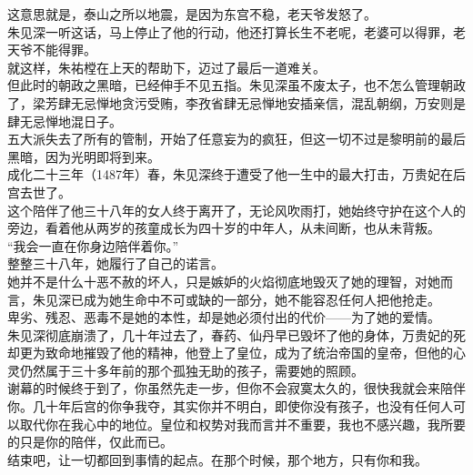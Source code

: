 \begin{multicols}{\theparacolNo}
这意思就是，泰山之所以地震，是因为东宫不稳，老天爷发怒了。\\

朱见深一听这话，马上停止了他的行动，他还打算长生不老呢，老婆可以得罪，老天爷不能得罪。\\

就这样，朱祐樘在上天的帮助下，迈过了最后一道难关。\\

但此时的朝政之黑暗，已经伸手不见五指。朱见深虽不废太子，也不怎么管理朝政了，梁芳肆无忌惮地贪污受贿，李孜省肆无忌惮地安插亲信，混乱朝纲，万安则是肆无忌惮地混日子。\\

五大派失去了所有的管制，开始了任意妄为的疯狂，但这一切不过是黎明前的最后黑暗，因为光明即将到来。\\

成化二十三年（1487年）春，朱见深终于遭受了他一生中的最大打击，万贵妃在后宫去世了。\\

这个陪伴了他三十八年的女人终于离开了，无论风吹雨打，她始终守护在这个人的旁边，看着他从两岁的孩童成长为四十岁的中年人，从未间断，也从未背叛。\\

“我会一直在你身边陪伴着你。”\\

整整三十八年，她履行了自己的诺言。\\

她并不是什么十恶不赦的坏人，只是嫉妒的火焰彻底地毁灭了她的理智，对她而言，朱见深已成为她生命中不可或缺的一部分，她不能容忍任何人把他抢走。\\

卑劣、残忍、恶毒不是她的本性，却是她必须付出的代价——为了她的爱情。\\

朱见深彻底崩溃了，几十年过去了，春药、仙丹早已毁坏了他的身体，万贵妃的死却更为致命地摧毁了他的精神，他登上了皇位，成为了统治帝国的皇帝，但他的心灵仍然属于三十多年前的那个孤独无助的孩子，需要她的照顾。\\

谢幕的时候终于到了，你虽然先走一步，但你不会寂寞太久的，很快我就会来陪伴你。几十年后宫的你争我夺，其实你并不明白，即使你没有孩子，也没有任何人可以取代你在我心中的地位。皇位和权势对我而言并不重要，我也不感兴趣，我所要的只是你的陪伴，仅此而已。\\

结束吧，让一切都回到事情的起点。在那个时候，那个地方，只有你和我。\\


\end{multicols}

